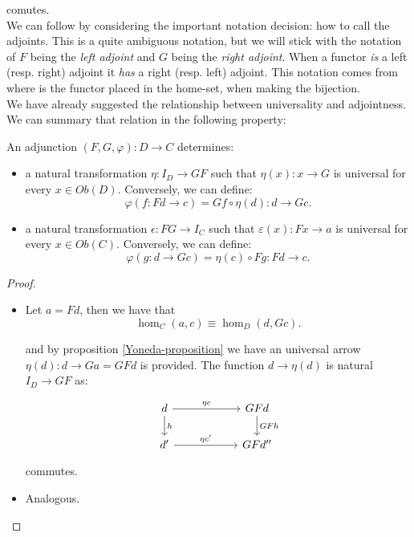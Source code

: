 comutes. \\

We can follow by considering the important notation decision: how to call the adjoints. This is a quite ambiguous notation, but we will stick with the notation of $F$ being the \emph{left adjoint} and $G$ being the \emph{right adjoint}. When a functor \emph{is} a left (resp. right) adjoint it \emph{has} a right (resp. left) adjoint. This notation comes from where is the functor placed in the home-set, when making the bijection.\\

We have already suggested the relationship between universality and adjointness. We can summary that relation in the following property:
\begin{proposition}
  An adjunction $(F,G,\varphi): D\to C $ determines:
  \begin{itemize}
  \item a natural transformation $\eta: I_D \to GF$ such that $\eta(x):x\to G$ is universal for every $x\in Ob(D)$. Conversely, we can define:
    $$\varphi(f:Fd\to c) = Gf\circ \eta(d): d\to G c.$$
  \item a natural transformation $\epsilon: FG\to I_C$ such that $\varepsilon(x):Fx\to a$ is universal for every $x\in Ob(C)$. Conversely, we can define:
    $$\varphi(g:d\to Gc) = \eta(c)\circ Fg: Fd\to c.$$
  \end{itemize}
\end{proposition}
\begin{proof}
  \begin{itemize}
  \item Let $a=Fd$, then we have that
    $$\hom_C(a, c)\equiv\hom_D(d, Gc).$$

    and by proposition \ref{Yoneda-proposition} we have an universal arrow $\eta (d):d\to Ga=GFd$ is provided. The function $d\to \eta(d)$ is natural $I_D\to GF$ as:
    \[
  \begin{tikzpicture}
  \node {\begin{tikzcd}[column sep=20mm]
      d\ar[r,"\eta c"]\ar[d,"h"] & GFd\ar[d,"GFh"]\\
      d'\ar[r,"\eta c'"] & GFd''
  \end{tikzcd}};
\end{tikzpicture}
\]
commutes. 
  \item Analogous.
  \end{itemize} 
\end{proof}


